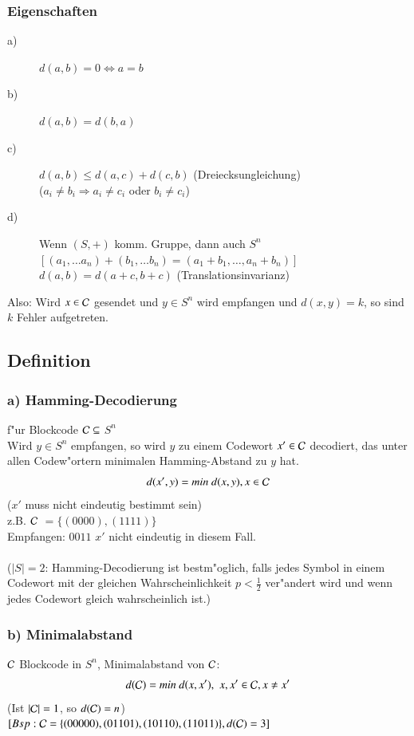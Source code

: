 \subsubsection{Eigenschaften}
\begin{description}
	\item[a)] $d(a,b)=0 \Leftrightarrow a=b$
	\item[b)] $d(a,b)=d(b,a)$
	\item[c)] $d(a,b) \leq d(a,c) + d(c,b)$ (Dreiecksungleichung) \\
			($a_i \neq b_i \Rightarrow a_i \neq c_i$ oder $b_i \neq c_i$) 
	\item[d)] 	Wenn $(S,+)$ komm. Gruppe, dann auch $S^n$\\
				$[ (a_1,\ldots a_n) + (b_1, \ldots b_n) = (a_1+b_1,\ldots, a_n+b_n)]$\\
				$d(a,b)=d(a+c,b+c)$ (Translationsinvarianz)				
\end{description}

\noindent Also: Wird $x \in \mathcal{C}$ gesendet und $y \in S^n$ wird empfangen und $d(x,y)=k$, so sind $k$ Fehler aufgetreten.
\subsection{Definition}
\subsubsection{a) Hamming-Decodierung}
f"ur Blockcode $\mathcal{C} \subseteq$ $S^n$ \\
Wird $y \in S^n$ empfangen, so wird $y$ zu einem Codewort $x' \in \mathcal{C}$ decodiert, das unter allen Codew"ortern minimalen Hamming-Abstand zu $y$ hat.
\[
	d(x',y)=min\  d(x,y), x \in \mathcal{C}
\]
($x'$ muss nicht eindeutig bestimmt sein)\\
z.B. $\mathcal{C}$ $ = \{ (0000), (1111) \}$\\
Empfangen: $0011$ $x'$ nicht eindeutig in diesem Fall.\\
\\
($\left| S \right | = 2$: Hamming-Decodierung ist bestm"oglich, falls jedes Symbol in einem Codewort mit der gleichen Wahrscheinlichkeit $p < \frac{1}{2}$ ver"andert wird und wenn jedes Codewort gleich wahrscheinlich ist.)

\subsubsection{b) Minimalabstand}
$\mathcal{C}$ Blockcode in $S^n$, Minimalabstand von $\mathcal{C}$:
\[
	d(\mathcal{C}) = min \  d(x,x')\mathbf{,}\ \  x,x' \in \mathcal{C}, x \neq x'
\]
(Ist $\left| \mathcal{C} \right| = 1$, so $d(\mathcal{C})=n$)\\
$[Bsp: \mathcal{C} = \lbrace (00000),(01101),(10110),(11011) \rbrace , d(\mathcal{C})=3]$

